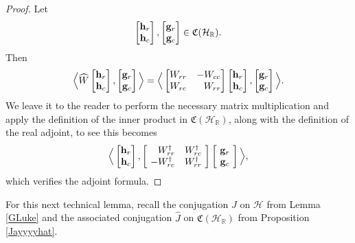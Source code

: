 \documentclass{dis}
\newcommand{\phm}{\phantom{-}}
\theoremstyle{plain}
\theoremstyle{definition}
\def\R{\mathbb{R}}
\renewcommand{\vec}[1]{{\bf #1}}
\newcommand{\0}{{\color{lightgray}0}}
\begin{document}
\begin{proof}
Let
$$\begin{bmatrix}\vec{h}_r\\ \vec{h}_c\end{bmatrix},  \begin{bmatrix} \vec{g}_r\\\vec{g}_{c}\end{bmatrix} \in \mathfrak{C}(\mathcal{H}_{\R}).$$ Then
$$
 \Big\langle \widehat{W} \begin{bmatrix} \vec{h}_r \\ \vec{h}_{c}\end{bmatrix}, \begin{bmatrix} \vec{g}_r\\ \vec{g}_c\end{bmatrix}\Big\rangle  = \Big\langle \begin{bmatrix} W_{rr} & -W_{cc}\\ W_{rc} &\phm W_{rr}\end{bmatrix} \begin{bmatrix} \vec{h}_{r}\\ \vec{h}_{c}\end{bmatrix}, \begin{bmatrix} \vec{g}_{r}\\ \vec{g}_{c}\end{bmatrix}\Big\rangle.
$$
We leave it to the reader to perform the necessary matrix multiplication and apply the definition of the inner product in $\mathfrak{C}(\mathcal{H}_{\R})$, along with the definition of the real adjoint, to see this becomes
$$\Big\langle \begin{bmatrix} \vec{h}_r \\ \vec{h}_c \end{bmatrix},\left[\!{\begin{array}{cc}\phantom{-} W_{rr}^{\dagger}& W_{rc}^{\dagger} \\- W_{rc}^{\dagger} & W_{rr}^{\dagger}\end{array}}\!\right]\left[\!{\begin{array}{c} \vec{g}_r \\ \vec{g}_c \end{array}}\!\right]\Big\rangle,$$
which verifies the adjoint formula.
\end{proof}

For this next technical lemma, recall the conjugation $J$ on $\mathcal{H}$ from Lemma \ref{GLuke} and the associated conjugation $\widehat{J}$ on $\mathfrak{C}(\mathcal{H}_{\R})$  from Proposition \ref{Jayyyyhat}.
\end{document}
